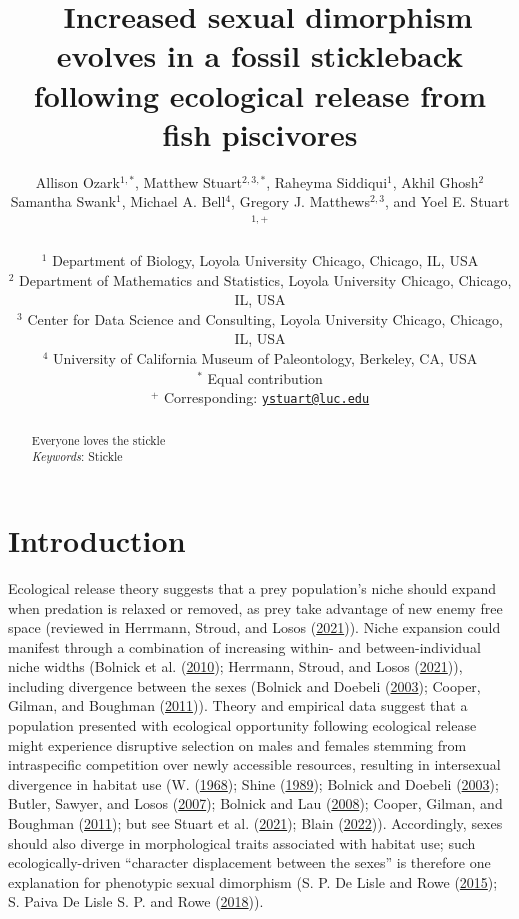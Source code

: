 \documentclass[
  12pt,
]{article}
\title{~\Large Increased sexual dimorphism evolves in a fossil
stickleback following ecological release from fish piscivores}
\author{\large Allison Ozark\(^{1,*}\), Matthew Stuart\(^{2,3,*}\),
Raheyma Siddiqui\(^1\), Akhil Ghosh\(^2\)\\
\large Samantha Swank\(^1\), Michael A. Bell\(^4\), Gregory J.
Matthews\(^{2,3}\), and Yoel E. Stuart\(^{1,+}\)\\
\vspace{-1.1mm}\\
\large \(^1\) Department of Biology, Loyola University Chicago, Chicago,
IL, USA \vspace{-1.1mm}\\
\large \(^2\) Department of Mathematics and Statistics, Loyola
University Chicago, Chicago, IL, USA \vspace{-1.1mm}\\
\large \(^3\) Center for Data Science and Consulting, Loyola University
Chicago, Chicago, IL, USA \vspace{-1.1mm}\\
\large \(^4\) University of California Museum of Paleontology, Berkeley,
CA, USA \vspace{-1.1mm}\\
\large \(^*\) Equal contribution \vspace{-1.1mm}\\
\large \(^+\) Corresponding:
\href{mailto:ystuart@luc.edu}{\nolinkurl{ystuart@luc.edu}}
\vspace{-1.1mm}}
\date{}
\begin{document}
\maketitle
\begin{abstract}
Everyone loves the stickle \vspace{2mm}\\
\emph{Keywords}: Stickle
\end{abstract}

\newcommand{\iid}{\overset{iid}{\sim}}

\newpage

\hypertarget{sec:intro}{%
\section{Introduction}\label{sec:intro}}

Ecological release theory suggests that a prey population's niche should
expand when predation is relaxed or removed, as prey take advantage of
new enemy free space (reviewed in Herrmann, Stroud, and Losos
(\protect\hyperlink{ref-Herrmann2021}{2021})). Niche expansion could
manifest through a combination of increasing within- and
between-individual niche widths (Bolnick et al.
(\protect\hyperlink{ref-Bolnick2010}{2010}); Herrmann, Stroud, and Losos
(\protect\hyperlink{ref-Herrmann2021}{2021})), including divergence
between the sexes (Bolnick and Doebeli
(\protect\hyperlink{ref-Bolnick2003}{2003}); Cooper, Gilman, and
Boughman (\protect\hyperlink{ref-Cooper2011}{2011})). Theory and
empirical data suggest that a population presented with ecological
opportunity following ecological release might experience disruptive
selection on males and females stemming from intraspecific competition
over newly accessible resources, resulting in intersexual divergence in
habitat use (W. (\protect\hyperlink{ref-Schoener1968}{1968}); Shine
(\protect\hyperlink{ref-Shine1989}{1989}); Bolnick and Doebeli
(\protect\hyperlink{ref-Bolnick2003}{2003}); Butler, Sawyer, and Losos
(\protect\hyperlink{ref-Butler2007}{2007}); Bolnick and Lau
(\protect\hyperlink{ref-Bolnick2008}{2008}); Cooper, Gilman, and
Boughman (\protect\hyperlink{ref-Cooper2011}{2011}); but see Stuart et
al. (\protect\hyperlink{ref-Stuart2021}{2021}); Blain
(\protect\hyperlink{ref-Blain2022}{2022})). Accordingly, sexes should
also diverge in morphological traits associated with habitat use; such
ecologically-driven ``character displacement between the sexes'' is
therefore one explanation for phenotypic sexual dimorphism (S. P. De
Lisle and Rowe (\protect\hyperlink{ref-deLisleRowe2015}{2015}); S. Paiva
De Lisle S. P. and Rowe (\protect\hyperlink{ref-deLisleNco2018}{2018})).
\end{document}
